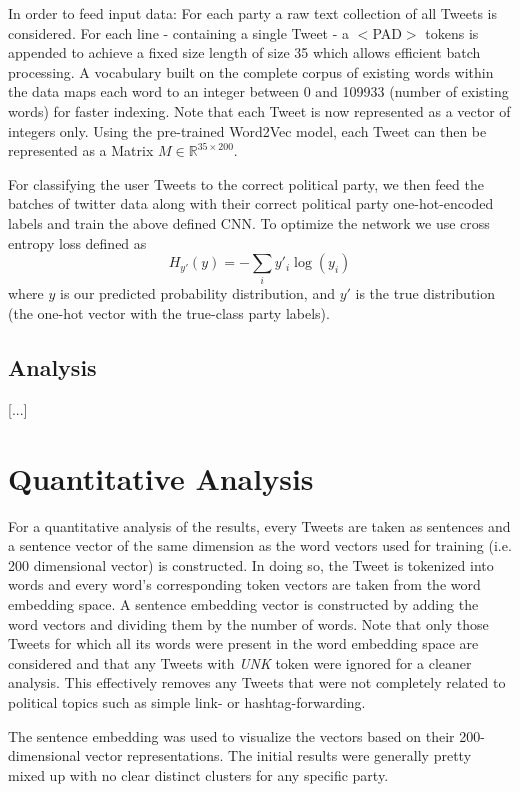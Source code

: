 \documentclass[10pt, oneside]{article}
\begin{document}
\begin{multicols}{2}
In order to feed input data: For each party a raw text collection of all Tweets is considered. For each line - containing a single Tweet - a $<$PAD$>$ tokens is appended to achieve a fixed size length of size 35 which allows efficient batch processing. A vocabulary built on the complete corpus of existing words within the data maps each word to an integer between 0 and 109933 (number of existing words) for faster indexing.
Note that each Tweet is now represented as a vector of integers only. Using the pre-trained Word2Vec model, each Tweet can then be represented as a Matrix $M \in \mathbb{R}^{35 \times 200}$.

For classifying the user Tweets to the correct political party, we then feed the batches of twitter data along with their correct political party one-hot-encoded labels and train the above defined CNN. To optimize the network we use cross entropy loss defined as
\begin{equation*}
	H_{y'}(y) = - \sum_{i} y'_{i} \log (y_{i})
\end{equation*}
where $y$ is our predicted probability distribution, and $y'$ is the true distribution (the one-hot vector with the true-class party labels). 

\subsection{Analysis}

[...]


\section{Quantitative Analysis}

For a quantitative analysis of the results, every Tweets are taken as sentences and a sentence vector of the same dimension as the word vectors used for training (i.e. 200 dimensional vector) is constructed. In doing so, the Tweet is tokenized into words and every word's corresponding token vectors are taken from the word embedding space. A sentence embedding vector is constructed by adding the word vectors and dividing them by the number of words. Note that only those Tweets for which all its words were present in the word embedding space are considered and that any Tweets with \emph{UNK} token were ignored for a cleaner analysis. This effectively removes any Tweets that were not completely related to political topics such as simple link- or hashtag-forwarding. 

The sentence embedding was used to visualize the vectors based on their 200-dimensional vector representations. The initial results were generally pretty mixed up with no clear distinct clusters for any specific party.


\end{multicols}
\end{document}
